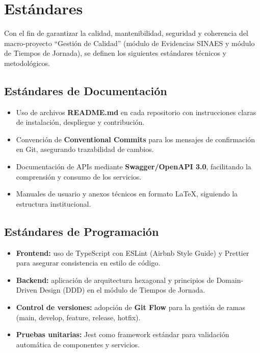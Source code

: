 \chapter{Estándares}

Con el fin de garantizar la calidad, mantenibilidad, seguridad y coherencia del macro-proyecto “Gestión de Calidad” (módulo de Evidencias SINAES y módulo de Tiempos de Jornada), se definen los siguientes estándares técnicos y metodológicos.

\section{Estándares de Documentación}
\begin{itemize}
    \item Uso de archivos \textbf{README.md} en cada repositorio con instrucciones claras de instalación, despliegue y contribución.
    \item Convención de \textbf{Conventional Commits} para los mensajes de confirmación en Git, asegurando trazabilidad de cambios.
    \item Documentación de APIs mediante \textbf{Swagger/OpenAPI 3.0}, facilitando la comprensión y consumo de los servicios.
    \item Manuales de usuario y anexos técnicos en formato \LaTeX, siguiendo la estructura institucional.
\end{itemize}

\section{Estándares de Programación}
\begin{itemize}
    \item \textbf{Frontend:} uso de TypeScript con ESLint (Airbnb Style Guide) y Prettier para asegurar consistencia en estilo de código.
    \item \textbf{Backend:} aplicación de arquitectura hexagonal y principios de Domain-Driven Design (DDD) en el módulo de Tiempos de Jornada.
    \item \textbf{Control de versiones:} adopción de \textbf{Git Flow} para la gestión de ramas (main, develop, feature, release, hotfix).
    \item \textbf{Pruebas unitarias:} Jest como framework estándar para validación automática de componentes y servicios.
\end{itemize}

